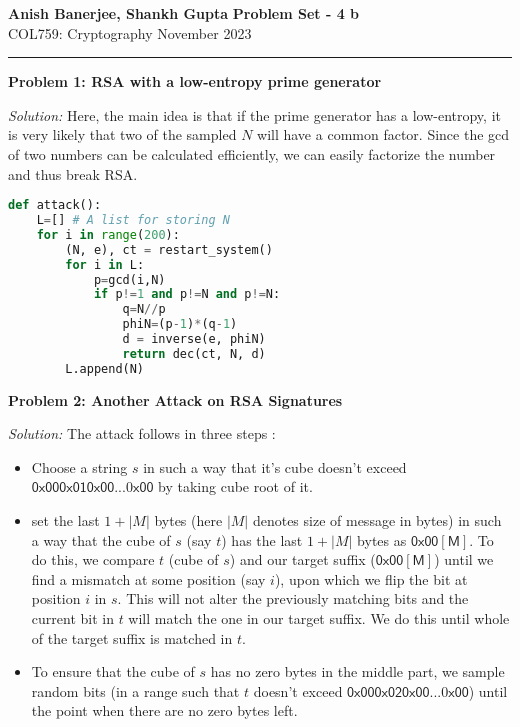 \documentclass[a4paper, 11pt]{article}
\newcommand{\hr}{\noindent\rule{7in}{2.8pt}}
\newenvironment{solution}
    {\textit{Solution:}}
    {}
\newcommand{\prob}[1]{\begin{mdframed}[backgroundcolor=gray!20] \textbf{Problem #1}\end{mdframed}}
\begin{document}
\noindent
\large\textbf{Anish Banerjee, Shankh Gupta} \hfill \textbf{Problem Set - 4 b}   \\
\normalsize COL759: Cryptography \hfill November 2023\\
\hr


\prob{1: RSA with a low-entropy prime generator}
\begin{solution}
    Here, the main idea is that if the prime generator has a low-entropy, it is very likely that two of the sampled $N$ will have a common factor. Since the gcd of two numbers can be calculated efficiently, we can easily factorize the number and thus break RSA.
    \begin{lstlisting}[language=Python, caption=RSA with a low-entropy prime generator]
def attack():
    L=[] # A list for storing N
    for i in range(200):
        (N, e), ct = restart_system()
        for i in L:
            p=gcd(i,N)
            if p!=1 and p!=N and p!=N:
                q=N//p
                phiN=(p-1)*(q-1)
                d = inverse(e, phiN)
                return dec(ct, N, d)
        L.append(N)
        \end{lstlisting}
\end{solution}

\prob{2: Another Attack on RSA Signatures}
\begin{solution}
    The attack follows in three steps : 
    \begin{itemize}
        \item Choose a string $s$ in such a way that it's cube doesn't exceed $\mathsf{0x000x010x00...0x00}$ by taking cube root of it.
        \item set the last $1+|M|$ bytes (here $|M|$ denotes size of message in bytes) in such a way that the cube of $s$ (say $t$) has the last $1+|M|$ bytes as $\mathsf{0x00[M]}$. To do this, we compare $t$ (cube of $s$) and our target suffix ($\mathsf{0x00[M]}$) until we find a mismatch at some position (say $i$), upon which we flip the bit at position $i$ in $s$. This will not alter the previously matching bits and the current bit in $t$ will match the one in our target suffix. We do this until whole of the target suffix is matched in $t$.
        \item To ensure that the cube of $s$ has no zero bytes in the middle part, we sample random bits (in a range such that $t$ doesn't exceed $\mathsf{0x000x020x00...0x00}$) until the point when there are no zero bytes left.
    \end{itemize}
\end{solution}
\end{document}
